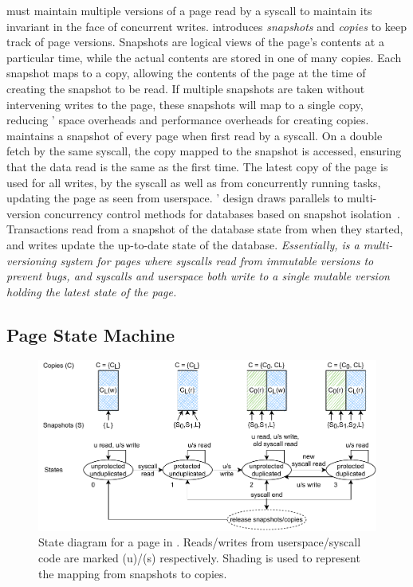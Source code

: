 \midas must maintain multiple versions of a page read by a syscall
to maintain its invariant in the face of concurrent writes.
\midas introduces \emph{snapshots} and \emph{copies} to keep track
of page versions.
Snapshots are logical views of the page's contents at a particular time,
while the actual contents are stored in one of many copies.
Each snapshot maps to a copy, allowing the contents of the page at the
time of creating the snapshot to be read.
If multiple snapshots are taken without intervening writes to the page,
these snapshots will map to a single copy, reducing \midas' space overheads
and performance overheads for creating copies.
\midas maintains a snapshot of every page when first read by a syscall.
On a double fetch by the same syscall, the copy mapped to the snapshot
is accessed, ensuring that the data read is the same as the first time.
The latest copy of the page is used for all writes, by the syscall as
well as from concurrently running tasks, updating the page as seen
from userspace.
%
\midas' design draws parallels to multi-version concurrency control
methods for databases based on snapshot isolation~\cite{WuALXP17}.
Transactions read from a snapshot of the database state from when
they started, and writes update the up-to-date state of the database.
%
\emph{Essentially, \midas is a multi-versioning system for pages where
syscalls read from immutable versions to prevent \tocttou bugs, and
syscalls and userspace both write to a single mutable version
holding the latest state of the page.}

\subsection{Page State Machine}

\begin{figure}[]
  \centering
  \includegraphics[width=\linewidth]{media/midas/midas_states.pdf}
  \caption[State diagram for a page in \midas.]
          {State diagram for a page in \midas. Reads/writes from userspace/syscall
          code are marked (u)/(s) respectively. Shading is used to represent the
          mapping from snapshots to copies.}
  \label{fig:midas:midas_states}
\end{figure}

